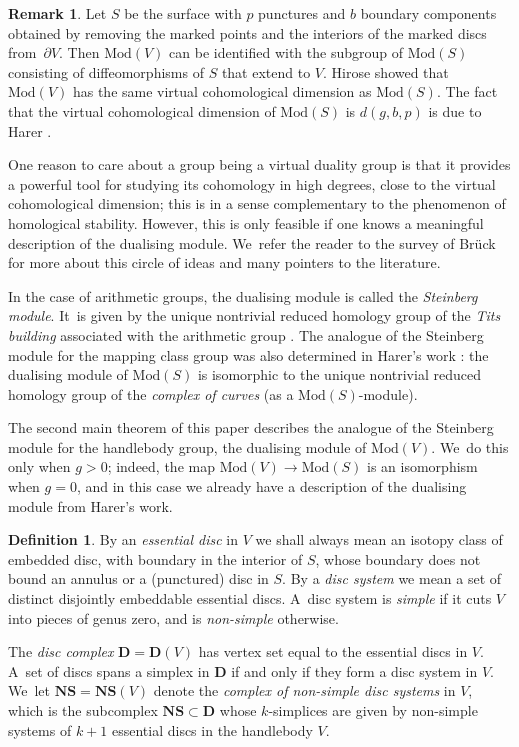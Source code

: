\documentclass[JEP,XML,SOM,Unicode,NoFloatCountersInSection,published]{cedram}
\theoremstyle{plain}
\theoremstyle{definition}
\newtheorem{rem}[thm]{Remark}
\newtheorem{defn}[thm]{Definition}
\newcommand{\compNS}{\mathbf{NS}}
\newcommand{\compD}{\mathbf{D}}
\newcommand{\mcg}{\mathrm{Mod}}
\newcommand{\hmod}{\mathrm{Mod}}
\begin{document}
\begin{rem} Let $S$ be the surface with $p$ punctures and $b$ boundary components obtained by removing the marked points and the interiors of the marked discs from~$\partial V$. Then $\mcg(V)$ can be identified with the subgroup of $\mcg(S)$ consisting of diffeomorphisms of $S$ that extend to $V$. Hirose \cite{hirose} showed that $\mcg(V)$ has the same virtual cohomological dimension as $\mcg(S)$. The fact that the virtual cohomological dimension of $\mcg(S)$ is $d(g,b,p)$ is due to Harer \cite{harer}.
\end{rem}

One reason to care about a group being a virtual duality group is that it provides a powerful tool for studying its cohomology in high degrees, close to the virtual cohomological dimension; this is in a sense complementary to the phenomenon of homological stability. However, this is only feasible if one knows a meaningful description of the dualising module. We~refer the reader to the survey of Brück \cite{bruck-survey} for more about this circle of ideas and many pointers to the literature.

In the case of arithmetic groups, the dualising module is called the \emph{Steinberg module}. It~is given by the unique nontrivial reduced homology group of the \emph{Tits building} associated with the arithmetic group \cite{borelserre}. The analogue of the Steinberg module for the mapping class group was also determined in Harer's work \cite{harer}: the dualising module of $\mcg(S)$ is isomorphic to the unique nontrivial reduced homology group of the \emph{complex of curves} (as a $\mcg(S)$-module).

The second main theorem of this paper describes the analogue of the Steinberg module for the handlebody group, \ie the dualising module of $\mcg(V)$. We~do this only when $g>0$; indeed, the map $\hmod(V)\to\mcg(S)$ is an isomorphism when $g=0$, and in this case we already have a description of the dualising module from Harer's work.

\begin{defn}By an \emph{essential disc} in $V$ we shall always mean an isotopy class of embedded disc, with boundary in the interior of $S$, whose boundary does not bound an annulus or a (punctured) disc in $S$. By a \emph{disc system} we mean a set of distinct disjointly embeddable essential discs. A~disc system is \emph{simple} if it cuts $V$ into pieces of genus zero, and is \emph{non-simple} otherwise.

The \emph{disc complex} $\compD=\compD(V)$ has vertex set equal to the essential discs in $V$. A~set of discs spans a simplex in $\compD$ if and only if they form a disc system in $V$. We~let $\compNS = \compNS(V)$ denote the \emph{complex of non-simple disc systems} in $V$, which is the subcomplex $\compNS \subset \compD$ whose $k$-simplices are given by non-simple systems of $k+1$ essential discs in the handlebody $V$. \end{defn}
\end{document}
